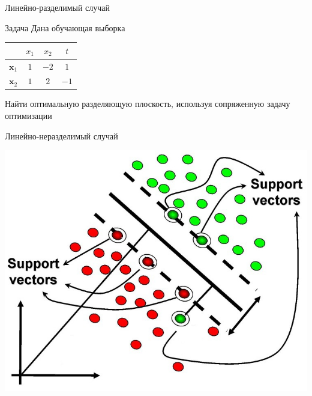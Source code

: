 \documentclass[10pt]{beamer}
\begin{document}
\begin{frame}{Линейно-разделимый случай}

\begin{block}{Задача}
Дана обучающая выборка

\begin{center}
\begin{tabular}{l|cc|c}
 & $x_1$ & $x_2$ & $t$ \\
 \hline
$\mathbf{x}_1$ & $1$ & $-2$ & $1$ \\
$\mathbf{x}_2$ & $1$ & $2$ & $-1$ \\
\end{tabular}
\end{center}

Найти оптимальную разделяющую плоскость, используя сопряженную задачу оптимизации

\end{block}

\end{frame}

\begin{frame}{Линейно-неразделимый случай}

\begin{center}
\includegraphics[scale=0.45]{images/svm.jpg}
\end{center}

\end{frame}
\end{document}
